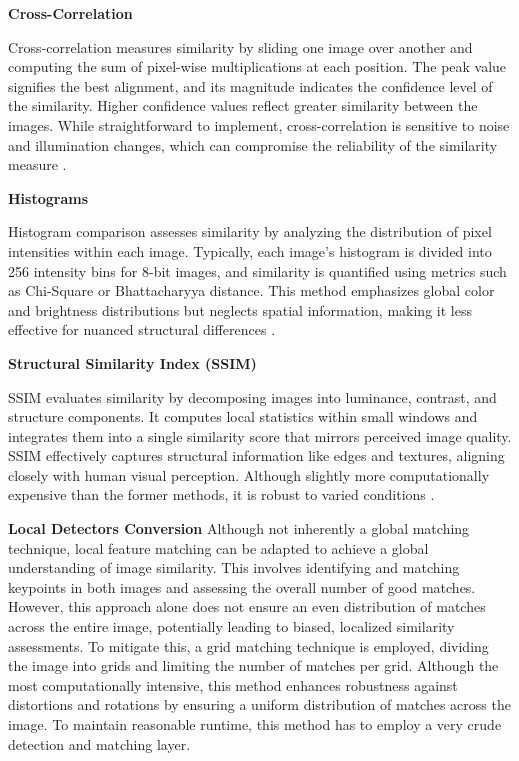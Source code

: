 \textbf{Cross-Correlation}

Cross-correlation measures similarity by sliding one image over another and computing the sum of pixel-wise multiplications at each position. The peak value signifies the best alignment, and its magnitude indicates the confidence level of the similarity. Higher confidence values reflect greater similarity between the images. While straightforward to implement, cross-correlation is sensitive to noise and illumination changes, which can compromise the reliability of the similarity measure \cite{sharma2022crosscorrelation}.

\textbf{Histograms}

Histogram comparison assesses similarity by analyzing the distribution of pixel intensities within each image. Typically, each image's histogram is divided into 256 intensity bins for 8-bit images, and similarity is quantified using metrics such as Chi-Square or Bhattacharyya distance. This method emphasizes global color and brightness distributions but neglects spatial information, making it less effective for nuanced structural differences \cite{rosebrock2014comparehistograms}.

\textbf{Structural Similarity Index (SSIM)}

SSIM evaluates similarity by decomposing images into luminance, contrast, and structure components. It computes local statistics within small windows and integrates them into a single similarity score that mirrors perceived image quality. SSIM effectively captures structural information like edges and textures, aligning closely with human visual perception. Although slightly more computationally expensive than the former methods, it is robust to varied conditions \cite{rosebrock2017imagedifference}. 


\textbf{Local Detectors Conversion}
Although not inherently a global matching technique, local feature matching can be adapted to achieve a global understanding of image similarity. This involves identifying and matching keypoints in both images and assessing the overall number of good matches. However, this approach alone does not ensure an even distribution of matches across the entire image, potentially leading to biased, localized similarity assessments. To mitigate this, a grid matching technique is employed, dividing the image into grids and limiting the number of matches per grid. Although the most computationally intensive, this method enhances robustness against distortions and rotations by ensuring a uniform distribution of matches across the image. To maintain reasonable runtime, this method has to employ a very crude detection and matching layer. 



